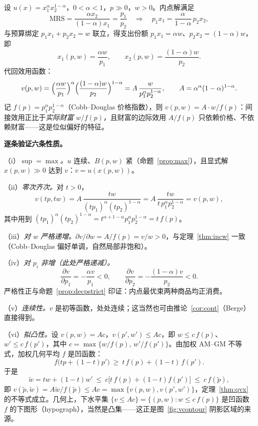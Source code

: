 \begin{example}
\label{ex:cd}
设 $u(x)=x_1^{\alpha}x_2^{1-\alpha}$，$0<\alpha<1$，$p\gg0$，$w>0$。内点解满足
\[
\mathrm{MRS}=\frac{\alpha x_2}{(1-\alpha)x_1}=\frac{p_1}{p_2}
\quad\Longrightarrow\quad
p_1x_1=\frac{\alpha}{1-\alpha}\,p_2x_2 ,
\]
与预算绑定 $p_1x_1+p_2x_2=w$ 联立，得支出份额 $p_1x_1=\alpha w$、$p_2x_2=(1-\alpha)w$，即
\[
x_1(p,w)=\frac{\alpha w}{p_1},\qquad x_2(p,w)=\frac{(1-\alpha)w}{p_2}.
\]
代回效用函数：
\[
v(p,w)=\Bigl(\frac{\alpha w}{p_1}\Bigr)^{\alpha}\Bigl(\frac{(1-\alpha)w}{p_2}\Bigr)^{1-\alpha}
= A\,\frac{w}{p_1^{\alpha}p_2^{1-\alpha}},
\qquad A=\alpha^{\alpha}(1-\alpha)^{1-\alpha}.
\]
记 $f(p)=p_1^{\alpha}p_2^{1-\alpha}$（Cobb--Douglas 价格指数），则 $v(p,w)=A\cdot w/f(p)$：间接效用正比于\emph{实际财富} $w/f(p)$，且财富的边际效用 $A/f(p)$ 只依赖价格、不依赖财富——这是位似偏好的特征。
\end{example}

\textbf{逐条验证六条性质。}

（i）\emph{$\sup=\max$。}$u$ 连续、$B(p,w)$ 紧（命题~\ref{prop:max}），且显式解 $x(p,w)\gg0$ 达到 $v$：$v=u(x(p,w))$。

（ii）\emph{零次齐次。}对 $t>0$，
\[
v(tp,tw)=A\,\frac{tw}{(tp_1)^{\alpha}(tp_2)^{1-\alpha}}
=A\,\frac{tw}{t\,p_1^{\alpha}p_2^{1-\alpha}}=v(p,w),
\]
其中用到 $(tp_1)^{\alpha}(tp_2)^{1-\alpha}=t^{\alpha+1-\alpha}p_1^{\alpha}p_2^{1-\alpha}=t\,f(p)$。

（iii）\emph{对 $w$ 严格递增。}$\partial v/\partial w=A/f(p)=v/w>0$，与定理~\ref{thm:incw} 一致（Cobb--Douglas 偏好单调，自然局部非饱和）。

（iv）\emph{对 $p_i$ 非增（此处严格递减）。}
\[
\frac{\partial v}{\partial p_1}=-\frac{\alpha v}{p_1}<0,\qquad
\frac{\partial v}{\partial p_2}=-\frac{(1-\alpha)v}{p_2}<0 .
\]
严格性正与命题~\ref{prop:decpstrict} 印证：内点最优束两种商品均正消费。

（v）\emph{连续性。}$v$ 是初等函数，处处连续；这当然也可由推论~\ref{cor:cont}（Berge）直接得到。

（vi）\emph{拟凸性。}设 $v(p,w)=Ac$，$v(p',w')\le Ac$，即 $w\le c\,f(p)$、$w'\le c\,f(p')$，其中 $c=\max\{w/f(p),\,w'/f(p')\}$。由加权 AM--GM 不等式，加权几何平均 $f$ 是凹函数：
\[
f\bigl(tp+(1-t)p'\bigr)\ \ge\ t\,f(p)+(1-t)\,f(p') .
\]
于是
\[
\tilde w=tw+(1-t)w'\ \le\ c\bigl[t\,f(p)+(1-t)f(p')\bigr]\ \le\ c\,f(\tilde p),
\]
即 $v(\tilde p,\tilde w)=A\tilde w/f(\tilde p)\le Ac=\max\{v(p,w),v(p',w')\}$，定理~\ref{thm:qvx} 的不等式成立。几何上，下水平集 $\{v\le Ac\}=\{(p,w):w\le c\,f(p)\}$ 是凹函数 $f$ 的下图形（hypograph），当然是凸集——这正是图~\ref{fig:vcontour} 阴影区域的来源。
